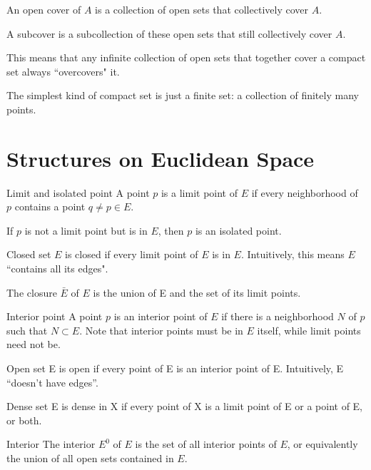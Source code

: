 An open cover of $A$ is a collection of open sets that collectively cover $A$.

A subcover is a subcollection of these open sets that still collectively cover $A$.

This means that any infinite collection of open sets that together cover a compact set always ``overcovers" it.

The simplest kind of compact set is just a finite set: a collection of finitely many points.


\section{Structures on Euclidean Space}
\begin{defn}{Limit and isolated point}{}
A point $p$ is a limit point of $E$ if every neighborhood of $p$ contains a point $q \neq p \in E$. 

If $p$ is not a limit point but is in $E$, then $p$ is an isolated point.
\end{defn}

\begin{defn}{Closed set}{}
$E$ is closed if every limit point of $E$ is in $E$. Intuitively, this means $E$ ``contains all its edges".

The closure $\bar{E}$ of $E$ is the union of E and the set of its limit points.
\end{defn}

\begin{defn}{Interior point}{}
A point $p$ is an interior point of $E$ if there is a neighborhood $N$ of $p$ such that $N \subset E$. Note that interior points must be in $E$ itself, while limit points need not be.
\end{defn}

\begin{defn}{Open set}{}
E is open if every point of E is an interior point of E. Intuitively, E “doesn’t have edges”.
\end{defn}

\begin{defn}{Dense set}{}
E is dense in X if every point of X is a limit point of E or a point of E, or both.
\end{defn}

\begin{defn}{Interior}{}
The interior $E^0$ of $E$ is the set of all interior points of $E$, or equivalently the union of all open sets contained in $E$.
\end{defn}

